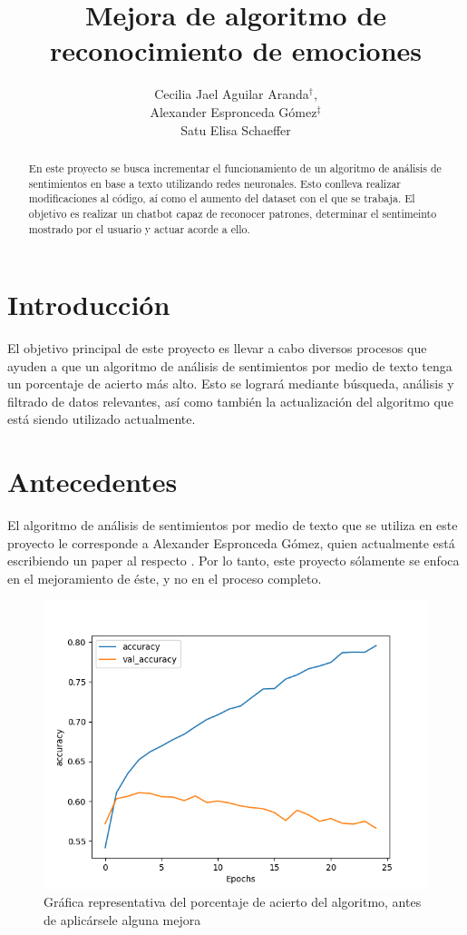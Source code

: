 \documentclass[a4]{sciposter}
\title{Mejora de algoritmo de\\reconocimiento de emociones}
\author{Cecilia Jael Aguilar Aranda$^\dagger$,\\Alexander Espronceda Gómez$^\ddagger$\\Satu Elisa Schaeffer}
\institute {Posgrado en Ingeniería de Sistemas}
\begin{document}

\maketitle

\begin{abstract}
En este proyecto se busca incrementar el funcionamiento de un algoritmo de análisis de sentimientos en base a texto utilizando redes neuronales. Esto conlleva realizar modificaciones al código, aí como el aumento del dataset con el que se trabaja. El objetivo es realizar un chatbot capaz de reconocer patrones, determinar el sentimeinto mostrado por el usuario y actuar acorde a ello.
\end{abstract}

\begin{multicols}{2} 

\section{Introducción}

El objetivo principal de este proyecto es llevar a cabo diversos procesos que ayuden a que un algoritmo de análisis de sentimientos por medio de texto tenga un porcentaje de acierto más alto. Esto se logrará mediante búsqueda, análisis y filtrado de datos relevantes, así como también la actualización del algoritmo que está siendo utilizado actualmente.

\section{Antecedentes}

El algoritmo de análisis de sentimientos por medio de texto que se utiliza en este proyecto le corresponde a Alexander Espronceda Gómez, quien actualmente está escribiendo un paper al respecto \citep{chatbot}. Por lo tanto, este proyecto sólamente se enfoca en el mejoramiento de éste, y no en el proceso completo.
\begin{figure}
	\centering
	\captionsetup{type=figure}
	\setcounter{figure}{0}
	\includegraphics[scale=1.5]{img/Accuracy 2020-05_nofilter}
	\caption{Gráfica representativa del porcentaje de acierto del algoritmo, antes de aplicársele alguna mejora}
	

\end{figure}
\end{multicols}
\end{document}
